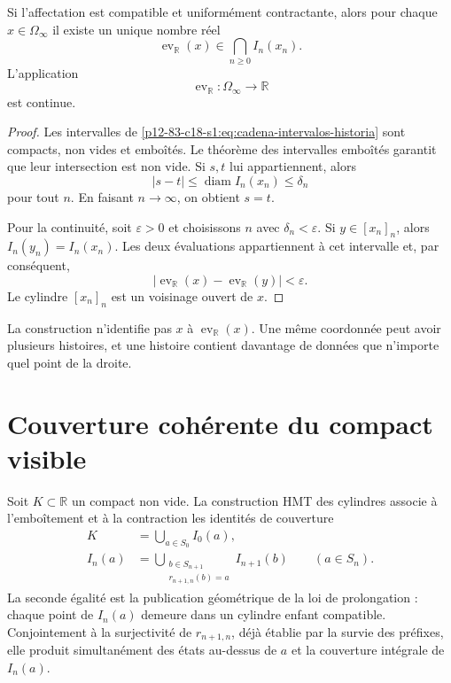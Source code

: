 \begin{theorem}
\label{p12-83-c18-s1:thm:evaluacion-unica-historia-u024}
Si l'affectation est compatible et uniformément contractante, alors pour
chaque \(x\in\Omega_\infty\) il existe un unique nombre réel
\begin{equation}
 \operatorname{ev}_{\mathbb R}(x)
 \in\bigcap_{n\geq0}I_n(x_n).
 \label{p12-83-c18-s1:eq:evaluacion-real-historia-u024}
\end{equation}
L'application
\begin{equation}
 \operatorname{ev}_{\mathbb R}:\Omega_\infty\longrightarrow\mathbb R
 \label{p12-83-c18-s1:eq:aplicacion-evaluacion-real-u024}
\end{equation}
est continue.
\end{theorem}

\begin{proof}
Les intervalles de \eqref{p12-83-c18-s1:eq:cadena-intervalos-historia} sont compacts,
non vides et emboîtés. Le théorème des intervalles emboîtés garantit que
leur intersection est non vide. Si \(s,t\) lui appartiennent, alors
\[
 |s-t|\leq\operatorname{diam}I_n(x_n)\leq\delta_n
\]
pour tout \(n\). En faisant \(n\to\infty\), on obtient \(s=t\).

Pour la continuité, soit \(\varepsilon>0\) et choisissons \(n\) avec
\(\delta_n<\varepsilon\). Si \(y\in[x_n]_n\), alors
\(I_n(y_n)=I_n(x_n)\). Les deux évaluations appartiennent à cet intervalle et,
par conséquent,
\[
 |\operatorname{ev}_{\mathbb R}(x)
  -\operatorname{ev}_{\mathbb R}(y)|<\varepsilon.
\]
Le cylindre \([x_n]_n\) est un voisinage ouvert de \(x\).
\end{proof}

La construction n'identifie pas \(x\) à
\(\operatorname{ev}_{\mathbb R}(x)\). Une même coordonnée peut avoir
plusieurs histoires, et une histoire contient davantage de données que n'importe quel point de
la droite.

\section{Couverture cohérente du compact visible}

Soit \(K\subset\mathbb R\) un compact non vide. La construction HMT des
cylindres associe à l'emboîtement et à la contraction les identités de
couverture
\begin{align}
 K&=\bigcup_{a\in S_0}I_0(a),
 \label{p12-83-c18-s1:eq:cobertura-inicial-compacto-u024}\\
 I_n(a)&=
 \bigcup_{\substack{b\in S_{n+1}\\r_{n+1,n}(b)=a}}
 I_{n+1}(b)
 \qquad(a\in S_n).
 \label{p12-83-c18-s1:eq:cobertura-extensiones-compatible-u024}
\end{align}
La seconde égalité est la publication géométrique de la loi de prolongation :
chaque point de \(I_n(a)\) demeure dans un cylindre enfant compatible. Conjointement à
la surjectivité de \(r_{n+1,n}\), déjà établie par la survie des
préfixes, elle produit simultanément des états au-dessus de \(a\) et la
couverture intégrale de \(I_n(a)\).


